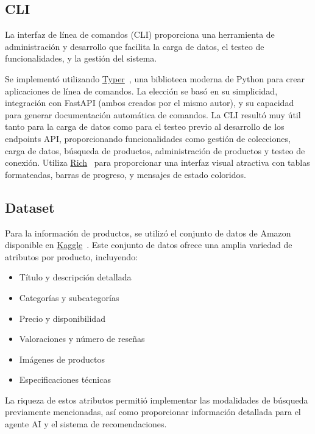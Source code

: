 \subsection{CLI}

La interfaz de línea de comandos (CLI) proporciona una herramienta de administración y desarrollo que facilita la carga de datos, el testeo de funcionalidades, y la gestión del sistema.

Se implementó utilizando \href{https://typer.tiangolo.com/}{Typer}~\cite{Typer}, una biblioteca moderna de Python para crear aplicaciones de línea de comandos. La elección se basó en su simplicidad, integración con FastAPI (ambos creados por el mismo autor), y su capacidad para generar documentación automática de comandos. La CLI resultó muy útil tanto para la carga de datos como para el testeo previo al desarrollo de los endpoints API, proporcionando funcionalidades como gestión de colecciones, carga de datos, búsqueda de productos, administración de productos y testeo de conexión. Utiliza \href{https://rich.readthedocs.io/}{Rich}~\cite{Rich} para proporcionar una interfaz visual atractiva con tablas formateadas, barras de progreso, y mensajes de estado coloridos.

\subsection{Dataset}

Para la información de productos, se utilizó el conjunto de datos de Amazon disponible en \href{https://www.kaggle.com/datasets/lokeshparab/amazon-products-dataset/data?select=Amazon-Products.csv}{Kaggle}~\cite{Amazon}. Este conjunto de datos ofrece una amplia variedad de atributos por producto, incluyendo:

\begin{itemize}
    \item Título y descripción detallada
    \item Categorías y subcategorías
    \item Precio y disponibilidad
    \item Valoraciones y número de reseñas
    \item Imágenes de productos
    \item Especificaciones técnicas
\end{itemize}

La riqueza de estos atributos permitió implementar las modalidades de búsqueda previamente mencionadas, así como proporcionar información detallada para el agente AI y el sistema de recomendaciones.

